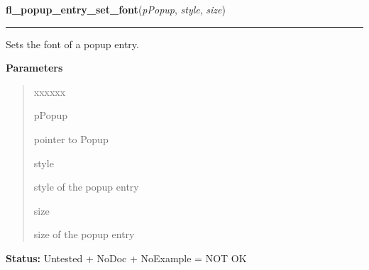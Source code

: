     \label{xformslib:library:fl_popup_entry_set_font}

    \vspace{0.5ex}

\hspace{.8\funcindent}\begin{boxedminipage}{\funcwidth}

    \raggedright \textbf{fl\_popup\_entry\_set\_font}(\textit{pPopup}, \textit{style}, \textit{size})

    \vspace{-1.5ex}

    \rule{\textwidth}{0.5\fboxrule}
\setlength{\parskip}{2ex}
    Sets the font of a popup entry.

\setlength{\parskip}{1ex}
      \textbf{Parameters}
      \vspace{-1ex}

      \begin{quote}
        \begin{Ventry}{xxxxxx}

          \item[pPopup]

          pointer to Popup

          \item[style]

          style of the popup entry

          \item[size]

          size of the popup entry

        \end{Ventry}

      \end{quote}

\textbf{Status:} Untested + NoDoc + NoExample = NOT OK



    \end{boxedminipage}

    \label{xformslib:library:fl_popup_get_bw}

    \vspace{0.5ex}

